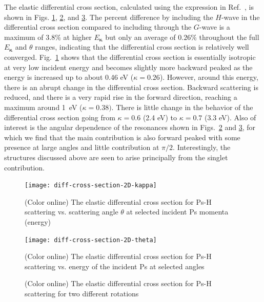 \documentclass[preprint,showpacs,showkeys,preprintnumbers,amsmath,amssymb,longbibliography,pra,aps]{revtex4-1}
\begin{document}
The elastic differential cross section, calculated using the expression in
Ref.~\cite{Bransden2003}, is shown in Figs.
\ref{fig:diff-cross-section-2D-kappa}, \ref{fig:diff-cross-section-2D-theta},
and \ref{fig:combined-diff-cross-sections}. The percent difference by including
the $H$-wave in the differential cross section compared to including through
the $G$-wave is a maximum of $3.8\%$ at higher $E_{\bm \kappa}$
but only an average of $0.26\%$ throughout the full
$E_{\bm \kappa}$ and $\theta$ ranges, indicating that the differential cross section
is relatively well converged. Fig.~\ref{fig:diff-cross-section-2D-kappa} shows
that the differential cross section is essentially
isotropic at very low incident energy and becomes slightly more backward peaked 
as the energy is increased up to about 0.46 eV ($\kappa = 0.26$). 
However, around this energy, there is an abrupt change in the differential 
cross section. Backward scattering is reduced, and there is a very rapid
rise in the forward direction, reaching a maximum 
around 1~eV ($\kappa = 0.38)$.
There is little change in the behavior of the differential cross section
going from $\kappa = 0.6$ (2.4 eV) to $\kappa = 0.7$ (3.3 eV).
Also of interest is the angular dependence of the resonances shown in
Figs.~\ref{fig:diff-cross-section-2D-theta} and 
\ref{fig:combined-diff-cross-sections}, for which we find that the main 
contribution is also forward peaked with some presence at large angles and 
little contribution at $\pi/2$.
Interestingly, the structures discussed above are seen to arise principally
from the singlet contribution.

\begin{figure}[H]
	\centering
	\texttt{[image: diff-cross-section-2D-kappa]}
	\caption{(Color online) The elastic differential cross section for Ps-H
scattering vs. scattering angle $\theta$ at selected incident Ps momenta (energy)}
	\label{fig:diff-cross-section-2D-kappa}
\end{figure}

\begin{figure}[H]
	\centering
	\texttt{[image: diff-cross-section-2D-theta]}
	\caption{(Color online) The elastic differential cross section for Ps-H
scattering vs. energy of the incident Ps at selected angles}
	\label{fig:diff-cross-section-2D-theta}
\end{figure}

\begin{figure}[H]%
    \centering
    \caption{(Color online) The elastic differential cross section for Ps-H scattering for two different rotations}%
    \label{fig:combined-diff-cross-sections}%
\end{figure}
\end{document}
